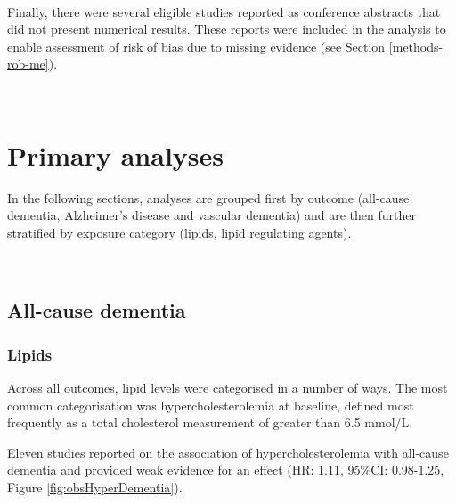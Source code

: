 \documentclass[a4paper, twoside]{templates/ociamthesis}
\begin{document}
~

Finally, there were several eligible studies reported as conference abstracts that did not present numerical results. These reports were included in the analysis to enable assessment of risk of bias due to missing evidence (see Section \ref{methods-rob-me}).

~

\hypertarget{primary-analyses}{%
\section{Primary analyses}\label{primary-analyses}}

In the following sections, analyses are grouped first by outcome (all-cause dementia, Alzheimer's disease and vascular dementia) and are then further stratified by exposure category (lipids, lipid regulating agents).

~

\hypertarget{sys-rev-res-Dementia}{%
\subsection{All-cause dementia}\label{sys-rev-res-Dementia}}

\hypertarget{lipids}{%
\subsubsection{Lipids}\label{lipids}}

Across all outcomes, lipid levels were categorised in a number of ways. The most common categorisation was hypercholesterolemia at baseline, defined most frequently as a total cholesterol measurement of greater than 6.5 mmol/L.

Eleven studies reported on the association of hypercholesterolemia with all-cause dementia and provided weak evidence for an effect (HR: 1.11, 95\%CI: 0.98-1.25, Figure \ref{fig:obsHyperDementia}).
\end{document}

